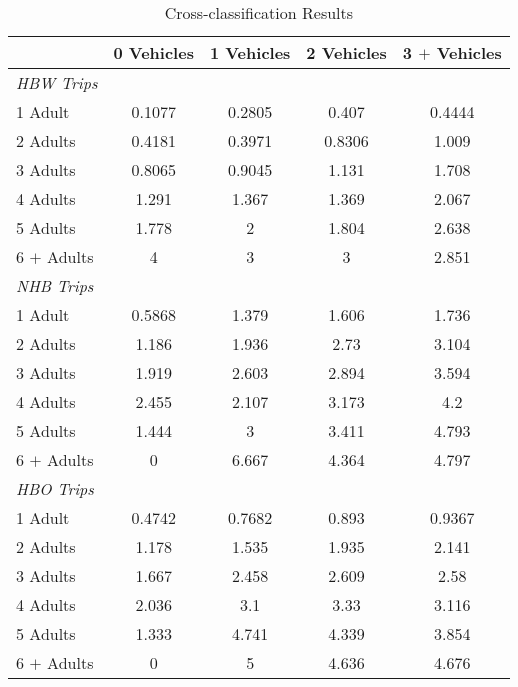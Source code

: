 \documentclass[]{texMemo}\usepackage[]{graphicx}\usepackage[]{color}
\begin{document}
\begin{table}
\begin{center}
  \caption{Cross-classification Results}
  \label{tab:ccresults}
\begin{tabular}{l c c c c}
\toprule
& 0 Vehicles & 1 Vehicles & 2 Vehicles & 3 $+$ Vehicles\\
\midrule
{\em HBW Trips} & & & &\\
1 Adult & 0.1077 
        & 0.2805 
        & 0.407 
        & 0.4444 \\

2 Adults & 0.4181 
         & 0.3971 
         & 0.8306 
         & 1.009 \\
3 Adults & 0.8065 
         & 0.9045 
         & 1.131 
         & 1.708 \\

4 Adults & 1.291 
         & 1.367 
         & 1.369 
         & 2.067 \\

5 Adults & 1.778 
         & 2 
         & 1.804 
         & 2.638 \\
6 $+$ Adults & 4 
             & 3 
             & 3 
             & 2.851 \\

\midrule
{\em NHB Trips} & & & &\\
1 Adult & 0.5868 
        & 1.379 
        & 1.606 
        & 1.736 \\

2 Adults & 1.186 
         & 1.936 
         & 2.73 
         & 3.104 \\
3 Adults & 1.919 
         & 2.603 
         & 2.894 
         & 3.594 \\

4 Adults & 2.455 
         & 2.107 
         & 3.173 
         & 4.2 \\

5 Adults & 1.444 
         & 3 
         & 3.411 
         & 4.793 \\
6 $+$ Adults & 0 
             & 6.667 
             & 4.364 
             & 4.797 \\
\midrule
{\em HBO Trips} & & & &\\
1 Adult & 0.4742 
        & 0.7682 
        & 0.893 
        & 0.9367 \\

2 Adults & 1.178 
         & 1.535 
         & 1.935 
         & 2.141 \\
3 Adults & 1.667 
         & 2.458 
         & 2.609 
         & 2.58 \\

4 Adults & 2.036 
         & 3.1 
         & 3.33 
         & 3.116 \\

5 Adults & 1.333 
         & 4.741 
         & 4.339 
         & 3.854 \\
6 $+$ Adults & 0 
             & 5 
             & 4.636 
             & 4.676 \\

\bottomrule
\end{tabular}
\end{center}
\end{table}
\end{document}
